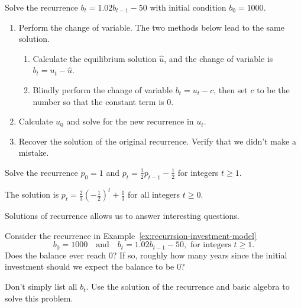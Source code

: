 \documentclass[../main.tex]{subfiles}
\begin{document}
\begin{example}
  Solve the recurrence \(b_{t} = 1.02 b_{t-1} - 50\) with initial condition \(b_{0} = 1000\).

  \begin{enumerate}[wide, label={Step~(\arabic*).}]
    \item Perform the change of variable. The two methods below lead to the same solution.
      \begin{enumerate}[label={(\alph*)}]
        \item Calculate the equilibrium solution \(\hat{u}\), and the change of variable is \(b_{t} = u_{t} - \hat{u}\).
        \item Blindly perform the change of variable \(b_{t} = u_{t} - c\), then set \(c\) to be the number so that the constant term is \(0\).
      \end{enumerate}

    \item Calculate \(u_{0}\) and solve for the new recurrence in \(u_{t}\). 

    \item Recover the solution of the original recurrence. Verify that we didn't make a mistake.
  \end{enumerate}
\end{example}
\clearpage

\begin{example}
  Solve the recurrence \(p_{0} = 1\) and \(p_{t} = \frac{1}{2} p_{t-1} - \frac{1}{2}\) for integers \(t \ge 1\).


  {\footnotesize The solution is \(p_{t} = \frac{2}{3} \left( -\frac{1}{2} \right)^{t} + \frac{1}{3}\) for all integers \(t \ge 0\).}
\end{example}

\clearpage

Solutions of recurrence allows us to answer interesting questions. 
\begin{example}
  Consider the recurrence in Example~\ref{ex:recurrsion-investment-model} 
  \[
    b_{0} = 1000 \quad\text{and}\quad b_{t} = 1.02 b_{t-1} - 50, \text{ for integers } t \ge 1. 
  \] 
  Does the balance ever reach \(0\)? If so, roughly how many years since the initial investment should we expect the balance to be \(0\)? 
  
  Don't simply list all \(b_{t}\). Use the solution of the recurrence and basic algebra to solve this problem.
\end{example}
\end{document}
